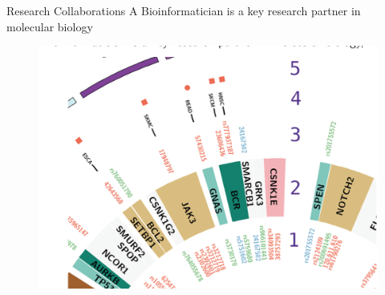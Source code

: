 \documentclass{beamer}
\begin{document}
	\begin{frame}{Research Collaborations}
		A Bioinformatician is a key research partner in molecular biology
		\begin{figure}[h]
			\centering
			\includegraphics[scale=0.45]{Figures/analyz.png}
		\end{figure}
		
		
	\end{frame}
	
\end{document}
